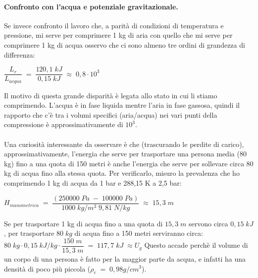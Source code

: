 \documentclass[a4paper, twoside, 12pt]{report}
\begin{document}
\paragraph{Confronto con l'acqua e potenziale gravitazionale.\\}
Se invece confronto il lavoro che, a parità di condizioni di temperatura e pressione, mi serve per comprimere 1 kg di aria con quello che mi serve per comprimere 1 kg di acqua osservo che ci sono almeno tre ordini di grandezza di differenza:
\begin{center}
	$\dfrac{L_{r}}{L_{acqua}}\;=\;\dfrac{120,1\;kJ}{0,15\;kJ}\;\approx\;0,8\cdot10^{3}$
\end{center}
Il motivo di questa grande disparità è legata allo stato in cui li stiamo comprimendo. L'acqua è in fase liquida mentre l'aria in fase gassosa, quindi il rapporto che c'è tra i volumi specifici (aria/acqua) nei vari punti della compressione è approssimativamente di $10^3$.\\
\\
Una curiosità interessante da osservare è che (trascurando le perdite di carico), approssimativamente, l'energia che serve per trasportare una persona media (80 kg) fino a una quota di 150 metri è anche l'energia che serve per sollevare circa 80 kg di acqua fino alla stessa quota.
Per verificarlo, misuro la prevalenza che ho comprimendo 1 kg di acqua da 1 bar e 288,15 K a 2,5 bar:
\begin{center}
	$H_{manometrica}\;=\;\dfrac{(250000\;Pa\;-\;100000\;Pa)}{1000\;kg/m^{3}\;9,81\;N/kg}\;\approx\;15,3\;m$
\end{center}
Se per trasportare 1 kg di acqua fino a una quota di $15,3\;m$ servono circa $0,15\;kJ$, per trasportare $80\;kg$ di acqua fino a 150 metri serviranno circa: $80\;kg\cdot0,15\;kJ/kg\cdot\dfrac{150\;m}{15,3\;m}\;=\;117,7\;kJ\;\approx{U_{g}}$
Questo accade perchè il volume di un corpo di una persona è fatto per la maggior parte da acqua, e infatti ha una densità di poco più piccola ($\rho_{c}\;=\;0,98g/cm^{3}$).
\newpage
\end{document}
